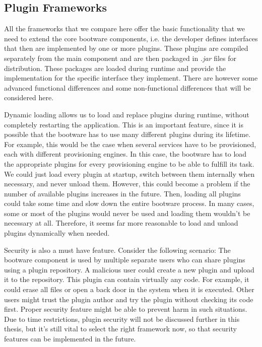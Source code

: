 \subsection{Plugin Frameworks}
\label{implementation:selecting:pluginframeworks}

All the frameworks that we compare here offer the basic functionality that we need to extend the core bootware components, i.e. the developer defines interfaces that then are implemented by one or more plugins.
These plugins are compiled separately from the main component and are then packaged in \textit{.jar} files for distribution.
These packages are loaded during runtime and provide the implementation for the specific interface they implement.
There are however some advanced functional differences and some non-functional differences that will be considered here.

Dynamic loading allows us to load and replace plugins during runtime, without completely restarting the application.
This is an important feature, since it is possible that the bootware has to use many different plugins during its lifetime.
For example, this would be the case when several services have to be provisioned, each with different provisioning engines.
In this case, the bootware has to load the appropriate plugins for every provisioning engine to be able to fulfill its task.
We could just load every plugin at startup, switch between them internally when necessary, and never unload them.
However, this could become a problem if the number of available plugins increases in the future.
Then, loading all plugins could take some time and slow down the entire bootware process.
In many cases, some or most of the plugins would never be used and loading them wouldn't be necessary at all.
Therefore, it seems far more reasonable to load and unload plugins dynamically when needed.

Security is also a must have feature.
Consider the following scenario: The bootware component is used by multiple separate users who can share plugins using a plugin repository.
A malicious user could create a new plugin and upload it to the repository.
This plugin can contain virtually any code.
For example, it could erase all files or open a back door in the system when it is executed.
Other users might trust the plugin author and try the plugin without checking its code first.
Proper security feature might be able to prevent harm in such situations.
Due to time restrictions, plugin security will not be discussed further in this thesis, but it's still vital to select the right framework now, so that security features can be implemented in the future.

